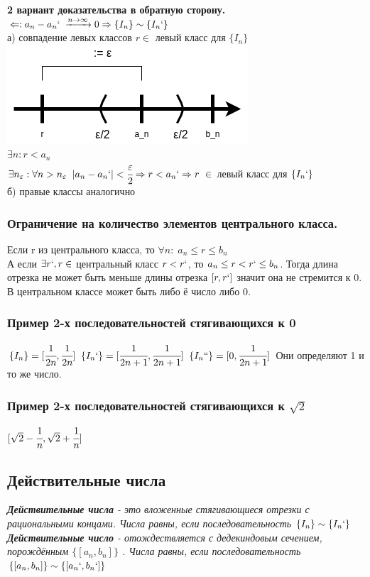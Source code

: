 \documentclass[12pt, paper]{article}
\newcommand{\eps}{\varepsilon}
\begin{document}
\begin{tcolorbox}[title=Доказательство Т1, breakable]
\textbf{2 вариант доказательства в обратную сторону.}\\
$\Leftarrow: a_n - a_n`\; \xrightarrow{n\rightarrow \infty} 0 \Rightarrow \{ I_n \} \sim \{ I_n` \}$\\
а) совпадение левых классов $r \in $ левый класс для $\{I_n\}$
\includegraphics[width=0.4\linewidth]{images/Дедекиндовы сечения/Доказательство Т1.2.png}\\
$\exists n: r < a_n$\\
$\exists n_\eps: \forall n>n_\eps \;\;|a_n-a_n`| < \cfrac{\eps}{2} \Rightarrow r < a_n` \Rightarrow r\ \in $ левый класс для $\{I_n`\}$ \\
б) правые классы аналогично
\end{tcolorbox}
\subsubsection{Ограничение на количество элементов центрального класса.}
Если r из центрального класса, то $\forall n: \; a_n \leq r \leq b_n$\\
А если $\exists r`,r \in $ центральный класс $r<r`$, то $a_n \leq r < r` \leq b_n$. Тогда длина отрезка не может быть меньше длины отрезка $[r,r`]$ значит она не стремится к 0.\\
В центральном классе может быть либо ё число либо 0.
\subsubsection{Пример 2-х последовательностей стягивающихся к 0}
$\{I_n\} = [\cfrac{1}{2n},\cfrac{1}{2n}]\;\; \{I_n`\} = [\cfrac{1}{2n+1},\cfrac{1}{2n+1}] \;\; \{I_n``\} = [0,\cfrac{1}{2n+1}]$ Они определяют 1 и то же число.
\subsubsection{Пример 2-х последовательностей стягивающихся к $\sqrt{2}$}
$[\sqrt{2} - \cfrac{1}{n}, \sqrt{2} + \cfrac{1}{n}]$
\subsection{Действительные числа}
\begin{tcolorbox}
\textit{\textbf{Действительные числа} - это вложенные стягивающиеся отрезки с рациональными концами. Числа равны, если последовательность $\{I_n\} \sim \{I_n`\}$  }\\
\textit{\textbf{Действительные число} - отождествляется с дедекиндовым сечением, порождённым $\{[a_n, b_n]\}$ . Числа равны, если последовательность $\{[a_n, b_n]\} \sim \{[a_n`, b_n`]\}$  }
\end{tcolorbox}
\end{document}
